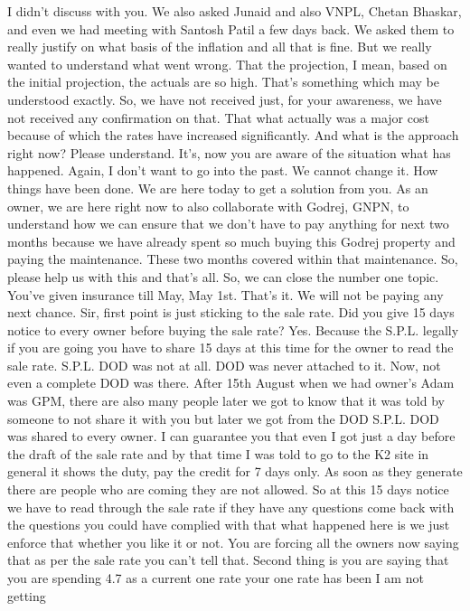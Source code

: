 I didn't discuss with you.
We also asked
Junaid and also
VNPL,
Chetan Bhaskar,
and even we had
meeting with Santosh Patil
a few days back.
We asked them to
really justify
on what basis
of the inflation
and all that is fine.
But we really wanted
to understand what
went wrong.
That the projection,
I mean, based on the
initial projection,
the actuals are so high.
That's
something which
may be
understood
exactly.
So,
we have not received
just,
for your
awareness,
we have not
received any
confirmation on that.
That what actually
was a major cost
because of which
the rates have
increased significantly.
And what is
the approach
right now?
Please understand.
It's,
now you are aware
of the situation
what has happened.
Again,
I don't want to
go into the past.
We cannot change it.
How things have been done.
We are here today
to get a solution from you.
As an owner,
we are here right now
to also collaborate
with Godrej,
GNPN,
to understand
how we can
ensure that
we don't have to
pay anything for
next two months
because we have already
spent so much
buying this
Godrej property
and paying the maintenance.
These two months
covered
within that maintenance.
So,
please help us
with this
and that's all.
So,
we can close
the number one
topic.
You've given
insurance till May,
May 1st.
That's it.
We will not be
paying any next
chance.
Sir,
first point
is just sticking
to the
sale rate.
Did you
give 15 days notice
to every owner
before
buying the
sale rate?
Yes.
Because the
S.P.L.
legally if you are going
you have to
share 15 days
at this
time
for the owner
to read
the
sale rate.
S.P.L.
DOD was not
at all.
DOD was never
attached to it.
Now,
not even a complete
DOD was there.
After
15th
August
when we had
owner's
Adam was
GPM,
there are also
many people
later we got to know
that it was
told by someone
to not share it
with you
but later
we got from
the DOD
S.P.L.
DOD was shared
to every owner.
I can
guarantee you that
even I got
just a day
before
the draft
of the sale rate
and
by that time
I was told
to
go to the K2
site
in general
it shows
the
duty,
pay the
credit for
7 days
only.
As soon as
they generate
there are
people who
are coming
they are not
allowed.
So
at this
15 days
notice we
have to
read through
the sale rate
if they have
any questions
come back
with the
questions
you could
have
complied with that
what happened
here is
we just
enforce that
whether you like it or not.
You are forcing
all the owners now
saying that
as per the sale rate
you can't tell that.
Second thing is
you are saying that
you are spending
4.7
as a
current
one rate
your one rate
has been
I am not getting
